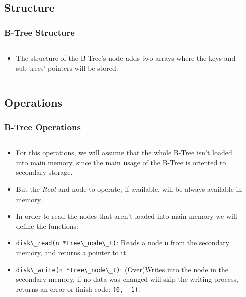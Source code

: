 \documentclass{beamer}
\begin{document}
\begin{frame}
    \subsection{Structure}
    \frametitle{B-Tree Structure}
    \begin{columns}
        \begin{column}{\textlecolumn}
            \begin{block}{}
                \begin{itemize}
                    \item The structure of the B-Tree's node adds two arrays where the keys and sub-trees' pointers will be stored:
                \end{itemize}
            \end{block}
            \begin{block}
                \btreeStructure
            \end{block}
        \end{column}
        \begin{column}{\textricolumn}
        \end{column}
    \end{columns}
\end{frame}
\begin{frame}
    \subsection{Operations}
    \frametitle{B-Tree Operations}
    \begin{columns}
        \begin{column}{\textlecolumn}
            \begin{block}{}
                \begin{itemize}
                    \item For this operations, we will assume that the whole B-Tree isn't loaded into main memory, since the main usage of the B-Tree is oriented to secondary storage. 
                    \item But the \emph{Root} and node to operate, if available, will be always available in memory.
                    \item In order to read the nodes that aren't loaded into main memory we will define the functions:
                    \item \lstinline|disk\_read(n *tree\_node\_t)|: Reads a node \lstinline|n| from the secondary memory, and returns a pointer to it.
                    \item \lstinline|disk\_write(n *tree\_node\_t)|: (Over)Writes into the node in the secondary memory, if no data was changed will skip the writing process, returns an error or finish code: \lstinline|(0, -1)|.
                \end{itemize}
            \end{block}
        \end{column}
        \begin{column}{\textricolumn}
        \end{column}
    \end{columns}
\end{frame}
\end{document}
